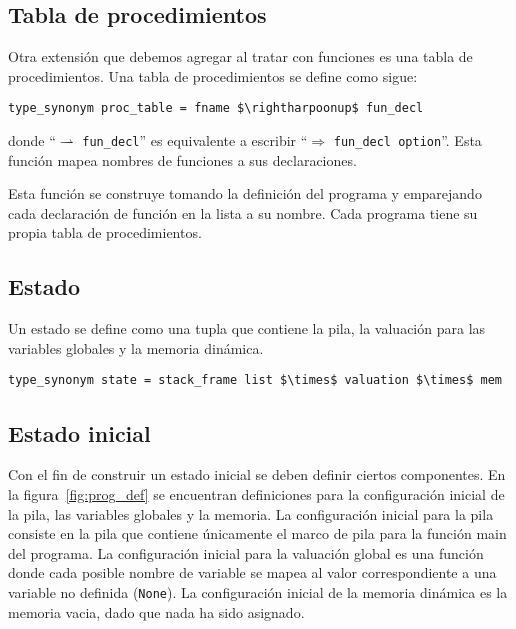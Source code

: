 \subsection{Tabla de procedimientos}\label{subsection:procedure_table}

Otra extensión que debemos agregar al tratar con funciones es una tabla de procedimientos.
Una tabla de procedimientos se define como sigue:

\begin{lstlisting}[mathescape=true, frame=single]
type_synonym proc_table = fname $\rightharpoonup$ fun_decl
\end{lstlisting}

donde ``$\rightharpoonup$ \verb|fun_decl|'' es equivalente a escribir ``$\Rightarrow$ \verb|fun_decl option|''.
Esta función mapea nombres de funciones a sus declaraciones.

Esta función se construye tomando la definición del programa y emparejando cada declaración de función en la lista a su nombre.
Cada programa tiene su propia tabla de procedimientos.


\subsection{Estado}\label{subsection:state}

Un estado se define como una tupla que contiene la pila, la valuación para las variables globales y la memoria dinámica.

\begin{lstlisting}[mathescape=true, frame=single]
type_synonym state = stack_frame list $\times$ valuation $\times$ mem
\end{lstlisting}

\subsection{Estado inicial}\label{subsection:initial_state}

Con el fin de construir un estado inicial se deben definir ciertos componentes.
En la figura~\ref{fig:prog_def} se encuentran definiciones para la configuración inicial de la pila, las variables globales y la memoria.
La configuración inicial para la pila consiste en la pila que contiene únicamente el marco de pila para la función main del programa.
La configuración inicial para la valuación global es una función donde cada posible nombre de variable se mapea al valor correspondiente a una variable no definida (\verb|None|).
La configuración inicial de la memoria dinámica es la memoria vacia, dado que nada ha sido asignado.

